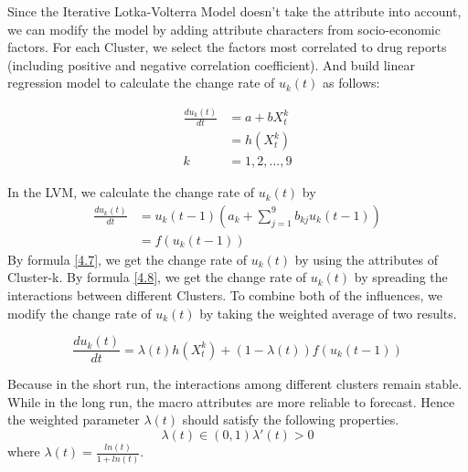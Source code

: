 \documentclass[11pt]{article}
\begin{document}
Since the Iterative Lotka-Volterra Model doesn’t take the attribute into account, we can modify the model by adding attribute characters from socio-economic factors. For each Cluster, we select the factors most correlated to drug reports (including positive and negative correlation coefficient). And build linear regression model to calculate the change rate of $u_k(t)$ as follows:

\begin{equation}
	\begin{aligned}
		\frac{du_{k}(t)}{dt} &= a + bX_{t}^{k} \\
		&=h(X_{t}^{k}) \\
		k &= 1,2,...,9
	\end{aligned}
	\label{4.7}
\end{equation}

In the LVM, we calculate the change rate of $u_{k}(t)$ by
\begin{equation}
	\begin{aligned}
	\frac{du_{k}(t)}{dt} &= u_{k}(t-1)(a_{k} + \sum_{j=1}^{9}b_{kj}u_{k}(t-1)) \\
	&=f(u_{k}(t-1))
	\end{aligned}
	\label{4.8}
\end{equation}
By formula \ref{4.7}, we get the change rate of $u_k(t)$ by using the attributes of Cluster-k. By formula \ref{4.8}, we get the change rate of $u_k(t)$ by spreading the interactions between different Clusters. To combine both of the influences, we modify the change rate of $u_k (t)$ by taking the weighted average of two results.

\begin{equation}
	\frac{du_{k}(t)}{dt} = \lambda(t)h(X_{t}^{k}) + (1-\lambda(t))f(u_{k}(t-1))
\end{equation}

Because in the short run, the interactions among different clusters remain stable. While in the long run, the macro attributes are more reliable to forecast. Hence the weighted parameter $\lambda(t)$ should satisfy the following properties. 
\begin{equation}
	\lambda(t) \in (0, 1) \lambda'(t) > 0
\end{equation}
where $\lambda(t) = \frac{ln(t)}{1+ln(t)}$.
\end{document}
